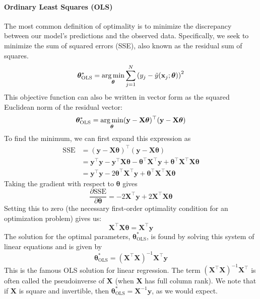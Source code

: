 \paragraph*{Ordinary Least Squares (OLS)}
The most common definition of optimality is to minimize the discrepancy between our model's predictions and the observed data. Specifically, we seek to minimize the sum of squared errors (SSE), also known as the residual sum of squares.
\begin{equation}
    \boldsymbol{\theta}^*_\text{OLS} = \operatorname*{arg\,min}_{\boldsymbol{\theta}} \sum_{j=1}^N \left(y_j - \tilde{y}(\mathbf{x}_j; \boldsymbol{\theta})\right)^2
\end{equation}
This objective function can also be written in vector form as the squared Euclidean norm of the residual vector:
\begin{equation}
    \boldsymbol{\theta}^*_\text{OLS} = \operatorname*{arg\,min}_{\boldsymbol{\theta}} (\mathbf{y} - \mathbf{X}\boldsymbol{\theta})^\top (\mathbf{y} - \mathbf{X}\boldsymbol{\theta})
\end{equation}
To find the minimum, we can first expand this expression as
\begin{align}
    \text{SSE} &= (\mathbf{y} - \mathbf{X}\boldsymbol{\theta})^\top (\mathbf{y} - \mathbf{X}\boldsymbol{\theta}) \\
                 &= \mathbf{y}^\top\mathbf{y} - \mathbf{y}^\top\mathbf{X}\boldsymbol{\theta} - \boldsymbol{\theta}^\top\mathbf{X}^\top\mathbf{y} + \boldsymbol{\theta}^\top\mathbf{X}^\top\mathbf{X}\boldsymbol{\theta} \\
                 &= \mathbf{y}^\top\mathbf{y} - 2\boldsymbol{\theta}^\top\mathbf{X}^\top\mathbf{y} + \boldsymbol{\theta}^\top\mathbf{X}^\top\mathbf{X}\boldsymbol{\theta}
\end{align}
Taking the gradient with respect to $\boldsymbol{\theta}$ gives
\begin{equation}
    \frac{\partial \text{SSE}}{\partial \boldsymbol{\theta}} = -2\mathbf{X}^\top\mathbf{y} + 2\mathbf{X}^\top\mathbf{X}\boldsymbol{\theta}
    \label{ols-sse-deriv}
\end{equation}
Setting this to zero (the necessary first-order optimality condition for an optimization problem) gives us:
\begin{equation}
    \mathbf{X}^\top\mathbf{X}\boldsymbol{\theta} = \mathbf{X}^\top\mathbf{y}
\end{equation}
The solution for the optimal parameters, $\boldsymbol{\theta}^*_\text{OLS}$, is found by solving this system of linear equations and is given by
\begin{equation}
    \boldsymbol{\theta}^*_\text{OLS} = (\mathbf{X}^\top\mathbf{X})^{-1}\mathbf{X}^\top\mathbf{y}
\end{equation}
This is the famous OLS solution for linear regression. The term $(\mathbf{X}^\top\mathbf{X})^{-1}\mathbf{X}^\top$ is often called the pseudoinverse of $\mathbf{X}$ (when $\mathbf{X}$ has full column rank). We note that if $\mathbf{X}$ is square and invertible, then $\boldsymbol{\theta}^*_\text{OLS} = \mathbf{X}^{-1}\mathbf{y}$, as we would expect.

